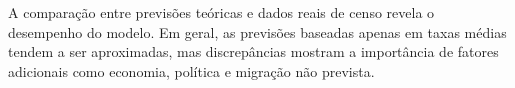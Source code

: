 A comparação entre previsões teóricas e dados reais de censo revela o desempenho do modelo. Em geral, as previsões baseadas apenas em taxas médias tendem a ser aproximadas, mas discrepâncias mostram a importância de fatores adicionais como economia, política e migração não prevista. 
